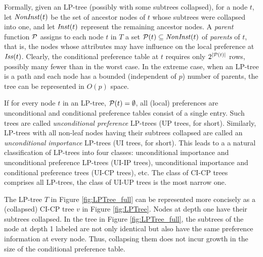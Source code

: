 Formally, given an LP-tree (possibly with some subtrees collapsed), for 
a node $t$, let $\mathit{NonInst}(t)$ be the set of ancestor nodes of $t$ whose
subtrees were collapsed into one, and let $\mathit{Inst}(t)$ represent the 
remaining ancestor nodes. A \emph{parent} function $\mathcal{P}$ assigns to 
each node $t$ in $T$ a set $\mathcal{P}(t)\subseteq\mathit{NonInst}(t)$ of \emph{parents}
of $t$, that is, the nodes whose attributes may have influence on the local 
preference at $\mathit{Iss}(t)$. Clearly, the conditional preference table at $t$
requires only $2^{|\mathcal{P}(t)|}$ rows, possibly many fewer than in the worst 
case. In the extreme case, when an LP-tree is a path and each node has 
a bounded (independent of $p$) number of parents, the tree can be 
represented in $O(p)$ space.

If for every node $t$ in an LP-tree, $\mathcal{P}(t)=\emptyset$, all (local)
preferences are unconditional and conditional preference tables consist
of a single entry. Such trees are called \emph{unconditional preference}
LP-trees (UP trees, for short). Similarly, LP-trees with all non-leaf 
nodes having their subtrees collapsed are called an \emph{unconditional
importance} LP-trees (UI trees, for short). This leads to a a natural 
classification of LP-trees into four classes: unconditional importance 
and unconditional preference LP-trees (UI-IP trees), unconditional 
importance and conditional preference trees (UI-CP trees), etc. The class
of CI-CP trees comprises all LP-trees, the class of UI-UP trees is the 
most narrow one. 

The LP-tree $T$ in Figure \ref{fig:LPTree_full} can be represented more
concisely as a (collapsed) CI-CP tree $v$ in Figure \ref{fig:LPTree}. Nodes
at depth one have their subtrees collapsed. In the tree in Figure
\ref{fig:LPTree_full}, the subtrees of the node at depth 1 labeled 
 are not only identical but also have the same preference 
information at every node. Thus, collapsing them does not incur growth in
the size of the conditional preference table.
      
